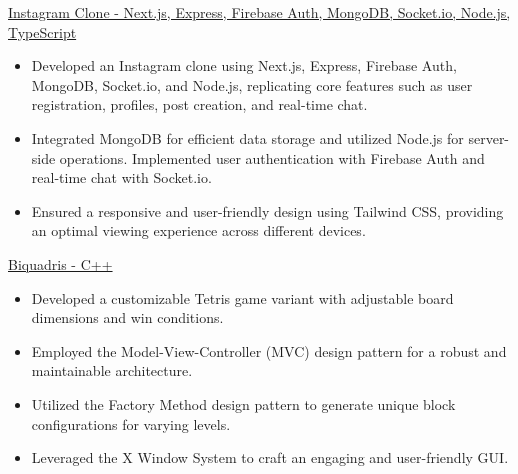 \documentclass[letterpaper,11pt]{article}
\newcommand{\resumeItem}[2]{
  \item\small{
    #1{ #2 \vspace{2pt}}
  }
}
\newcommand{\resumeSubItem}[2]{\resumeItem{#1}{#2}\vspace{0pt}}
\begin{document}
\resumeSubItem{\href{https://github.com/pl3lee/instagram-clone}{Instagram Clone - Next.js, Express, Firebase Auth, MongoDB, Socket.io, Node.js, TypeScript}}
{\begin{itemize}
		\item Developed an Instagram clone using Next.js, Express, Firebase Auth, MongoDB, Socket.io, and Node.js, replicating core features such as user registration, profiles, post creation, and real-time chat.
		\item Integrated MongoDB for efficient data storage and utilized Node.js for server-side operations. Implemented user authentication with Firebase Auth and real-time chat with Socket.io.
		\item Ensured a responsive and user-friendly design using Tailwind CSS, providing an optimal viewing experience across different devices.
	\end{itemize}}
\resumeSubItem{\href{https://github.com/pl3lee/Biquadris}{Biquadris - C++}}
{\begin{itemize}
		\item Developed a customizable Tetris game variant with adjustable board dimensions and win conditions.
		\item Employed the Model-View-Controller (MVC) design pattern for a robust and maintainable architecture.
		\item Utilized the Factory Method design pattern to generate unique block configurations for varying levels.
		\item Leveraged the X Window System to craft an engaging and user-friendly GUI.
	\end{itemize}}

\end{document}
